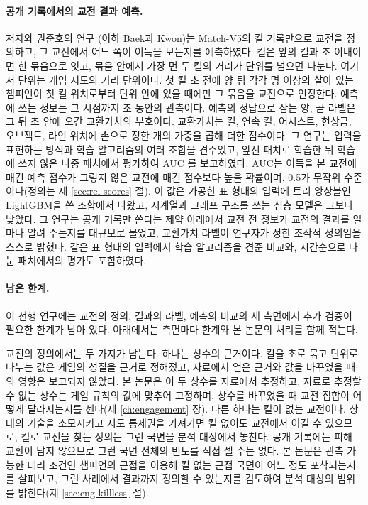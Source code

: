 \paragraph{공개 기록에서의 교전 결과 예측.} 저자와 권준호의 연구 \cite{baek2026killconditioned}(이하 Baek과 Kwon)는 Match-V5의 킬 기록만으로 교전을 정의하고, 그 교전에서 어느 쪽이 이득을 보는지를 예측하였다. 킬은 앞의 킬과 \cogGap{}초 이내이면 한 묶음으로 잇고, 묶음 안에서 가장 먼 두 킬의 거리가 \cogDiam{} 단위를 넘으면 나눈다. 여기서 단위는 게임 지도의 거리 단위이다. 첫 킬 \cogLead{}초 전에 양 팀 각각 \cogGateMin{}명 이상의 살아 있는 챔피언이 첫 킬 위치로부터 \cogGateR{} 단위 안에 있을 때에만 그 묶음을 교전으로 인정한다. 예측에 쓰는 정보는 그 시점까지 \cogWindow{}초 동안의 관측이다. 예측의 정답으로 삼는 양, 곧 라벨은 그 뒤 \cogLabelWindow{}초 안에 오간 교환가치의 부호이다. 교환가치는 킬, 연속 킬, 어시스트, 현상금, 오브젝트, 라인 위치에 손으로 정한 \cogWeights{}개의 가중을 곱해 더한 점수이다. 그 연구는 입력을 표현하는 방식과 학습 알고리즘의 여러 조합을 견주었고, 앞선 패치로 학습한 뒤 학습에 쓰지 않은 나중 패치에서 평가하여 AUC \aucCog{}를 보고하였다. AUC는 이득을 본 교전에 매긴 예측 점수가 그렇지 않은 교전에 매긴 점수보다 높을 확률이며, 0.5가 무작위 수준이다(정의는 제 \ref{sec:rel-scores} 절). 이 값은 가공한 표 형태의 입력에 트리 앙상블인 LightGBM을 쓴 조합에서 나왔고, 시계열과 그래프 구조를 쓰는 심층 모델은 그보다 낮았다. 그 연구는 공개 기록만 쓴다는 제약 아래에서 교전 전 정보가 교전의 결과를 얼마나 알려 주는지를 대규모로 물었고, 교환가치 라벨이 연구자가 정한 조작적 정의임을 스스로 밝혔다. 같은 표 형태의 입력에서 학습 알고리즘을 견준 비교와, 시간순으로 나눈 패치에서의 평가도 포함하였다.

\paragraph{남은 한계.} 이 선행 연구에는 교전의 정의, 결과의 라벨, 예측의 비교의 세 측면에서 추가 검증이 필요한 한계가 남아 있다. 아래에서는 측면마다 한계와 본 논문의 처리를 함께 적는다.

교전의 정의에서는 두 가지가 남는다. 하나는 상수의 근거이다. 킬을 \cogGap{}초로 묶고 \cogDiam{} 단위로 나누는 값은 게임의 성질을 근거로 정해졌고, 자료에서 얻은 근거와 값을 바꾸었을 때의 영향은 보고되지 않았다. 본 논문은 이 두 상수를 자료에서 추정하고, 자료로 추정할 수 없는 상수는 게임 규칙의 값에 맞추어 고정하며, 상수를 바꾸었을 때 교전 집합이 어떻게 달라지는지를 센다(제 \ref{ch:engagement} 장). 다른 하나는 킬이 없는 교전이다. 상대의 기술을 소모시키고 지도 통제권을 가져가면 킬 없이도 교전에서 이길 수 있으므로, 킬로 교전을 찾는 정의는 그런 국면을 분석 대상에서 놓친다. 공개 기록에는 피해 교환이 남지 않으므로 그런 국면 전체의 빈도를 직접 셀 수는 없다. 본 논문은 관측 가능한 대리 조건인 챔피언의 근접을 이용해 킬 없는 근접 국면이 어느 정도 포착되는지를 살펴보고, 그런 사례에서 결과까지 정의할 수 있는지를 검토하여 분석 대상의 범위를 밝힌다(제 \ref{sec:eng-killless} 절).

